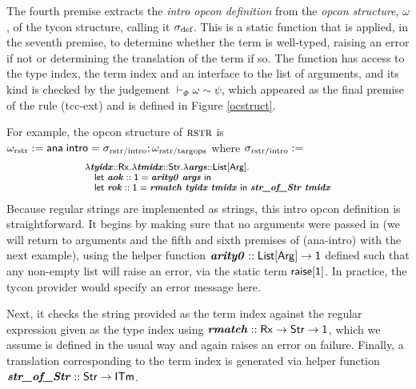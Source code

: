 \documentclass[10pt,preprint]{sigplanconf}
\begin{document}
The fourth premise extracts the \emph{intro opcon definition} from the \emph{opcon structure}, $\omega$, of the tycon structure, calling it $\sigma_\text{def}$. This is a static function that is applied, in the seventh premise, to determine whether the term is well-typed, raising an error if not or determining the translation of the term if so. The function has access to the type index, the term index and an interface to the list of arguments, and its kind is checked by the  judgement $\vdash_\Phi \omega \sim \psi$, which appeared as the final premise of the rule (tcc-ext) and is defined in Figure \ref{ocstruct}. 

For example, the opcon structure of $\textsc{rstr}$ is  $\small\omega_\text{rstr} := \tcstructn{\stx{rstr/intro}}; \omega_\text{rstr/targops}$ where $\small\stx{rstr/intro}:=$
\[\small\begin{array}{l}
    \slam{\krx}{\svar{tyidx}}{\slam{\kstr}{\svar{tmidx}}{\slam{\kargs}{\svar{args}}{\\
\quad \keyw{let}~\svar{aok} :: \kunit = \svar{arity0}~\svar{args}~\keyw{in}~\\
\quad \keyw{let}~\svar{rok} :: \kunit = \svar{rmatch}~\svar{tyidx}~\svar{tmidx}~\keyw{in}~\svar{str\_of\_Str}~\svar{tmidx}
}}}
\end{array}\]
Because regular strings are implemented as strings, this intro opcon definition is straightforward. It begins by making sure that no arguments were passed in (we will return to arguments and the fifth and sixth premises of (ana-intro) with the next example), using the helper function $\svar{arity0} :: \kargs \rightarrow \kunit$ defined such that any non-empty list will raise an error, via the static term ${\sf raise}[{\sf 1}]$. In practice, the tycon provider would specify an error message here.%



Next, it checks the string provided as the term index against the regular expression given as the type index using ${\textbf{\textit{rmatch}}} :: {\sf Rx} \rightarrow {\sf Str} \rightarrow {\sf 1}$, which we assume is defined in the usual way and again raises an error on failure. Finally, a {translation} corresponding to the term index is generated via  helper function $\svar{str\_of\_Str} :: \keyw{Str} \rightarrow \kitm$.%
\end{document}
